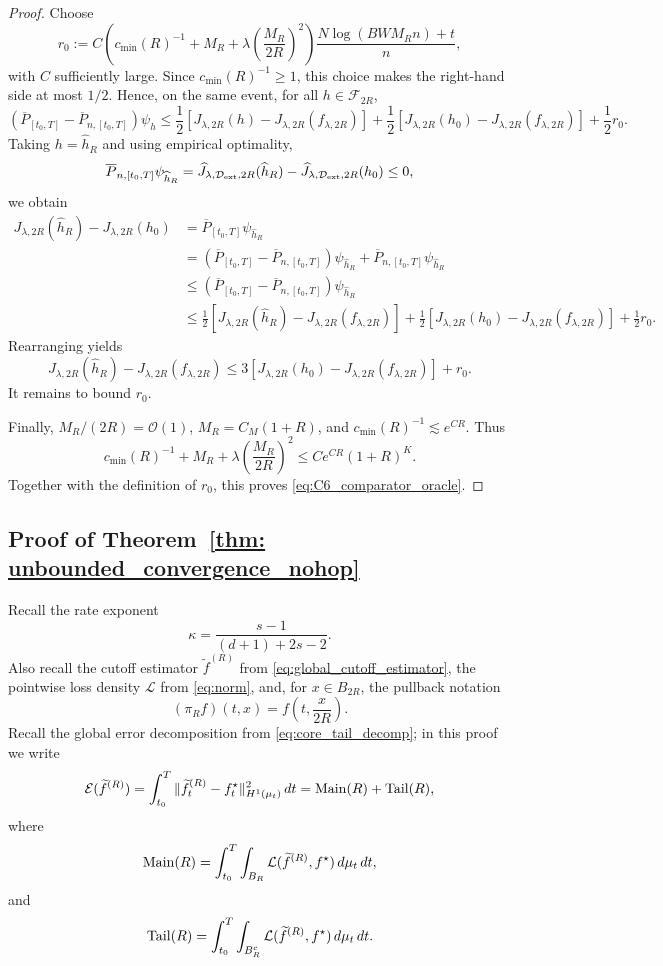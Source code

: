 \documentclass[11pt]{article}
\theoremstyle{plain}
\theoremstyle{definition}
\theoremstyle{remark}
\begin{document}
\begin{proof}
Choose
\[
r_0:=
C\left(c_{\min}(R)^{-1}
+
M_R
+
\lambda\left(\frac{M_R}{2R}\right)^2\right)\frac{N\log(BWM_R n)+t}{n}
,
\]
with \(C\) sufficiently large. Since \(c_{\min}(R)^{-1}\ge1\), this choice
makes the right-hand side at most \(1/2\). Hence, on the same event, for all
\(h\in\mathcal F_{2R}\),
\[
(\overline P_{[t_0,T]}-\overline P_{n,[t_0,T]})\psi_h
\le
\frac12
\left[
J_{\lambda,2R}(h)-J_{\lambda,2R}(f_{\lambda,2R})
\right]
+
\frac12
\left[
J_{\lambda,2R}(h_0)-J_{\lambda,2R}(f_{\lambda,2R})
\right]
+
\frac12 r_0.
\]
Taking \(h=\widehat h_R\) and using empirical optimality,
\[
\overline P_{n,[t_0,T]}\psi_{\widehat h_R}
=\widehat J_{\lambda,\mathcal D_{\rm ext},2R}(\widehat h_R)
-\widehat J_{\lambda,\mathcal D_{\rm ext},2R}(h_0)
\le0,
\]
we obtain
\[
\begin{aligned}
J_{\lambda,2R}(\widehat h_R)-J_{\lambda,2R}(h_0)
&=
\overline P_{[t_0,T]}\psi_{\widehat h_R}\\
&=
(\overline P_{[t_0,T]}-\overline P_{n,[t_0,T]})\psi_{\widehat h_R}
+
\overline P_{n,[t_0,T]}\psi_{\widehat h_R}\\
&\le
(\overline P_{[t_0,T]}-\overline P_{n,[t_0,T]})\psi_{\widehat h_R}\\
&\le
\frac12\left[
J_{\lambda,2R}(\widehat h_R)-J_{\lambda,2R}(f_{\lambda,2R})
\right]
+
\frac12\left[
J_{\lambda,2R}(h_0)-J_{\lambda,2R}(f_{\lambda,2R})
\right]
+
\frac12r_0.
\end{aligned}
\]
Rearranging yields
\[
J_{\lambda,2R}(\widehat h_R)-J_{\lambda,2R}(f_{\lambda,2R})
\le
3\left[
J_{\lambda,2R}(h_0)-J_{\lambda,2R}(f_{\lambda,2R})
\right]+r_0.
\]
It remains to bound \(r_0\).

Finally, \(M_R/(2R)=\mathcal{O}(1)\), \(M_R=C_M(1+R)\), and
\(c_{\min}(R)^{-1}\lesssim e^{CR}\). Thus
\[
c_{\min}(R)^{-1}
+
M_R
+
\lambda\left(\frac{M_R}{2R}\right)^2
\le
C e^{CR}(1+R)^K.
\]
Together with the definition of \(r_0\), this proves
\eqref{eq:C6_comparator_oracle}.
\end{proof}


\subsection{Proof of Theorem~\ref{thm: unbounded_convergence_nohop}}

Recall the rate exponent
\[
\kappa=
\frac{s-1}{(d+1)+2s-2}.
\]
Also recall the cutoff estimator \(\widetilde f^{(R)}\) from
\eqref{eq:global_cutoff_estimator}, the pointwise loss density
\(\mathcal L\) from \eqref{eq:norm}, and, for \(x\in B_{2R}\), the
pullback notation
\[
(\pi_R f)(t,x)=f\left(t,\frac{x}{2R}\right).
\]
Recall the global error decomposition from \eqref{eq:core_tail_decomp}; in
this proof we write
\begin{equation}
\label{eq:C3_global_error_decomposition}
\mathcal E(\widetilde f^{(R)})
=
\int_{t_0}^T
\|\widetilde f_t^{(R)}-f_t^\star\|_{H^1(\mu_t)}^2\,dt
=
{\rm Main}(R)+{\rm Tail}(R),
\end{equation}
where
\[
{\rm Main}(R)
=
\int_{t_0}^T\int_{B_R}
\mathcal L(\widetilde f^{(R)},f^\star)\,d\mu_t\,dt,
\]
and
\[
{\rm Tail}(R)
=
\int_{t_0}^T\int_{B_R^c}
\mathcal L(\widetilde f^{(R)},f^\star)\,d\mu_t\,dt.
\]
\end{document}
